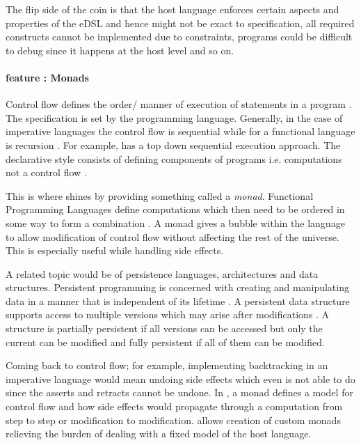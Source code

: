 \documentclass[thesis-solanki.tex]{subfiles}
\begin{document}
  The flip side of the coin is that the host language enforces certain aspects and properties of the eDSL and hence
  might not be exact to specification, all required constructs cannot be implemented due to constraints, programs
  could be difficult to debug since it happens at the host level and so on.

\paragraph{ feature : Monads}
Control flow defines the order/ manner of execution of statements in a pro\-gram \cite{website:controlflowwiki}.
The specification is set by the programming language.
Generally, in the case of imperative languages the control flow is sequential while for a functional language is
recursion \cite{website:controlflowdalhousie}.
For example,  has a top down sequential execution approach.
The declarative style consists of defining components of programs i.e.\yyy{}{\Large,}
computations not a control flow \cite{website:declarativeprogrammingwiki}.

This is where  shines by providing something called a \textit{monad}.
Functional Programming Languages
define computations which then need to be ordered in some way to form a
combination \cite{website:monadascomputation}.
A monad gives a bubble within the language to allow modification of control flow without affecting the rest of the
universe.
This is especially useful while handling side effects.

A related topic would be of persistence languages, architectures and data structures.
Persistent programming is concerned with creating and manipulating data in a manner that is independent of its
lifetime \cite{morrison1990persistent}.
A persistent data structure supports access to multiple versions which may arise after modifications
\cite{driscoll1986making, website:persistentdatastructuresmit}.
A structure is partially persistent if all versions can be accessed but only the current can be modified and fully
persistent if all of them can be modified.

Coming back to control flow; for example, implementing backtracking in an imperative language would mean undoing
side effects which even  is not able to do since the asserts and retracts cannot be undone.
In , a monad defines a model for control flow and how side effects would propagate through a
computation from step to step or modification to modification.
 allows creation of custom monads relieving the burden of dealing with a fixed model of the
host language.
\end{document}
